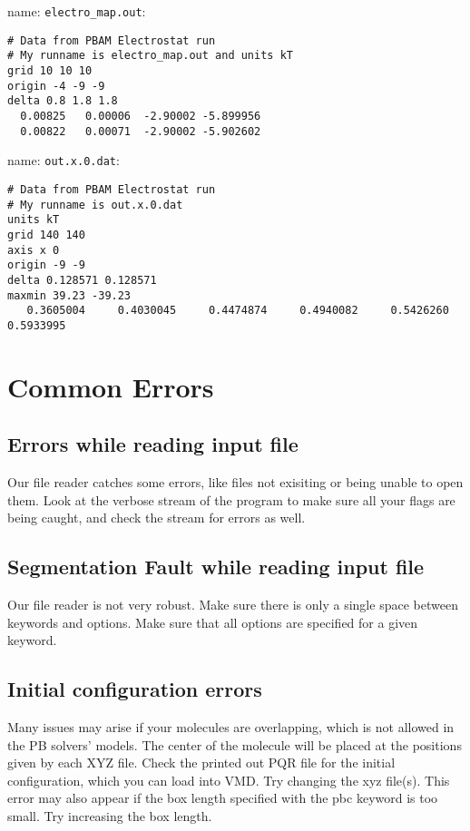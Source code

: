 name: \texttt{electro\_map.out}:
\begin{lstlisting}[style = MyBash]
# Data from PBAM Electrostat run
# My runname is electro_map.out and units kT
grid 10 10 10
origin -4 -9 -9
delta 0.8 1.8 1.8
  0.00825   0.00006  -2.90002 -5.899956 
  0.00822   0.00071  -2.90002 -5.902602 
\end{lstlisting}
\medskip

name: \texttt{out.x.0.dat}:
\begin{lstlisting}[style = MyBash]
# Data from PBAM Electrostat run
# My runname is out.x.0.dat
units kT
grid 140 140 
axis x 0 
origin -9 -9
delta 0.128571 0.128571
maxmin 39.23 -39.23
   0.3605004     0.4030045     0.4474874     0.4940082     0.5426260     0.5933995
\end{lstlisting}


\chapter{Common Errors}

\section{Errors while reading input file}
Our file reader catches some errors, like files not exisiting or
being unable to open them. Look at the verbose stream of the
program to make sure all your flags are being caught, and check the
stream for errors as well.

\section{Segmentation Fault while reading input file}
Our file reader is not very robust.
Make sure there is only a single space between keywords and options.
Make sure that all options are specified for a given keyword.

\section{Initial configuration errors}
Many issues may arise if your molecules are overlapping, which is not allowed in the PB solvers' models.
The center of the molecule will be placed at the positions given by each XYZ file.
Check the printed out PQR file for the initial configuration, which you can load into VMD.
Try changing the xyz file(s).
This error may also appear if the box length specified with the pbc keyword is too small.
Try increasing the box length.










